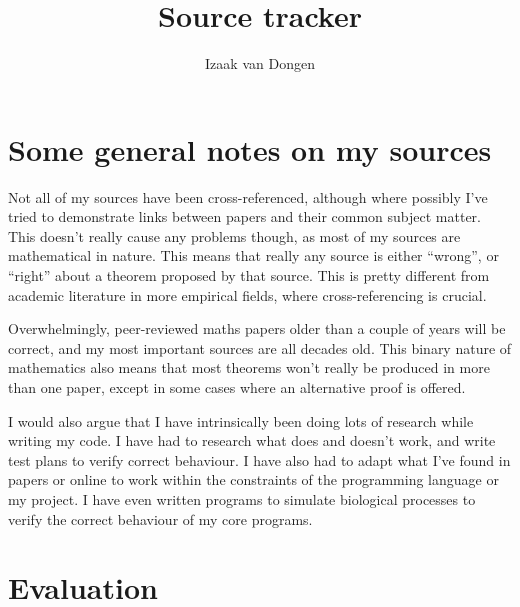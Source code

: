 \documentclass[a4paper,11pt]{article}
\title{Source tracker}
\author{Izaak van Dongen}
\begin{document}
    \maketitle

    \section{Some general notes on my sources} \label{sourcenotes}

    Not all of my sources have been cross-referenced, although where possibly
    I've tried to demonstrate links between papers and their common subject
    matter. This doesn't really cause any problems though, as most of my
    sources are mathematical in nature. This means that really any source is
    either ``wrong'', or ``right'' about a theorem proposed by that source.
    This is pretty different from academic literature in more empirical fields,
    where cross-referencing is crucial.

    Overwhelmingly, peer-reviewed maths papers older than a couple of years will
    be correct, and my most important sources are all decades old. This binary
    nature of mathematics also means that most theorems won't really be produced
    in more than one paper, except in some cases where an alternative proof is
    offered.

    I would also argue that I have intrinsically been doing lots of research
    while writing my code. I have had to research what does and doesn't work,
    and write test plans to verify correct behaviour. I have also had to adapt
    what I've found in papers or online to work within the constraints of the
    programming language or my project. I have even written programs to simulate
    biological processes to verify the correct behaviour of my core programs.

    \section{Evaluation}
\end{document}
